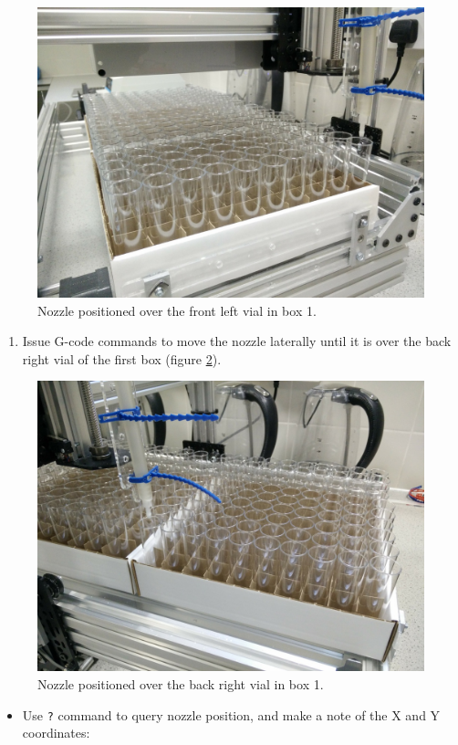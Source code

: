 \documentclass[]{book}
\providecommand{\tightlist}{%
  \setlength{\itemsep}{0pt}\setlength{\parskip}{0pt}}
\theoremstyle{definition}
\theoremstyle{definition}
\theoremstyle{remark}
\begin{document}
\begin{figure}

{\centering \includegraphics[width=0.5\linewidth]{images/box1_first_vial} 

}

\caption{Nozzle positioned over the front left vial in box 1.}\label{fig:box1FrontLeft}
\end{figure}

\begin{enumerate}
\def\labelenumi{\arabic{enumi}.}
\setcounter{enumi}{4}
\tightlist
\item
  Issue G-code commands to move the nozzle laterally until it is over
  the back right vial of the first box (figure \ref{fig:box1BackRight}).
\end{enumerate}

\begin{figure}

{\centering \includegraphics[width=0.5\linewidth]{images/box1_last_vial} 

}

\caption{Nozzle positioned over the back right vial in box 1.}\label{fig:box1BackRight}
\end{figure}

\begin{itemize}
\tightlist
\item
  Use \texttt{?} command to query nozzle position, and make a note of
  the X and Y coordinates:
\end{itemize}
\end{document}
